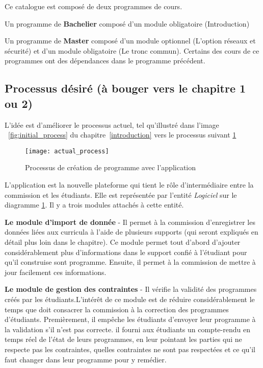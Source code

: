 Ce catalogue est composé de deux programmes de cours.

Un programme de \textbf{Bachelier} composé d'un module obligatoire (Introduction)

Un programme de \textbf{Master} composé d'un module optionnel (L'option réseaux et sécurité) et d'un module obligatoire (Le tronc commun). Certains des cours de ce programmes ont des dépendances dans le programme précédent.  

 

\subsection{Processus désiré (à bouger vers le chapitre 1 ou 2)}
L'idée est d'améliorer le processus actuel, tel qu'illustré dans l'image ~\ref{fig:initial_process} du chapitre~\ref{introduction} vers le processus suivant \ref{fig:actual_process}

\begin{figure}[H]
\centering
\caption{Processus de création de programme avec l'application}
\label{fig:actual_process}
\texttt{[image: actual\_process]}
\end{figure}

L'application est la nouvelle plateforme qui tient le rôle d'intermédiaire entre la commission et les étudiants. Elle est représentée par l'entité \textit{Logiciel} sur le diagramme \ref{fig:actual_process}. Il y a trois modules attachés à cette entité.

\textbf{Le module d'import de donnée} - Il permet à la commission d'enregistrer les données liées aux curricula  à l'aide de plusieurs supports (qui seront expliqués en détail plus loin dans le chapitre). Ce module permet tout d'abord d'ajouter considérablement plus d'informations dans le support confié à l'étudiant pour qu'il construise sont programme. Ensuite, il permet à la commission de mettre à jour facilement ces informations. 
 
\textbf{Le module de gestion des contraintes} - Il vérifie la validité des programmes créés par les étudiants.L'intérêt de ce module est de réduire considérablement  le temps que doit consacrer la commission à la correction des programmes d'étudiants. Premièrement, il empêche les étudiants d'envoyer leur programme à la validation s'il n'est pas correcte. il fourni aux étudiants un compte-rendu en temps réel de l'état de leurs programmes, en leur pointant les parties qui ne respecte pas les contraintes, quelles contraintes ne sont pas respectées et ce qu'il faut changer dans leur programme pour y remédier.


